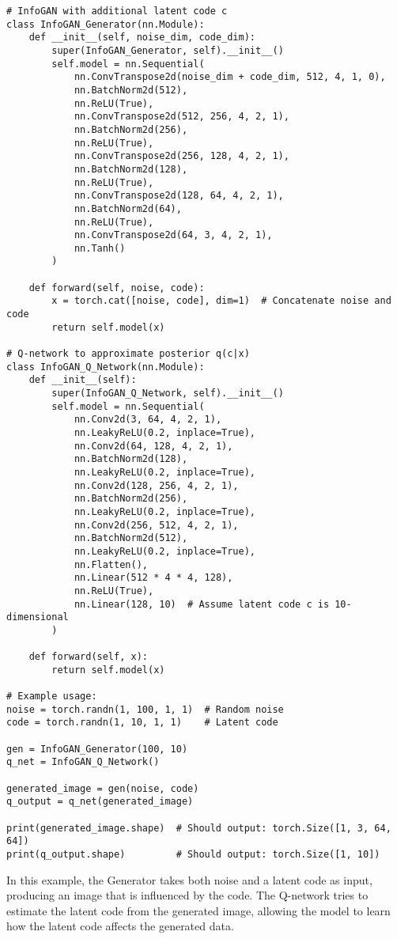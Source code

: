 \begin{lstlisting}[style=python]
# InfoGAN with additional latent code c
class InfoGAN_Generator(nn.Module):
    def __init__(self, noise_dim, code_dim):
        super(InfoGAN_Generator, self).__init__()
        self.model = nn.Sequential(
            nn.ConvTranspose2d(noise_dim + code_dim, 512, 4, 1, 0),
            nn.BatchNorm2d(512),
            nn.ReLU(True),
            nn.ConvTranspose2d(512, 256, 4, 2, 1),
            nn.BatchNorm2d(256),
            nn.ReLU(True),
            nn.ConvTranspose2d(256, 128, 4, 2, 1),
            nn.BatchNorm2d(128),
            nn.ReLU(True),
            nn.ConvTranspose2d(128, 64, 4, 2, 1),
            nn.BatchNorm2d(64),
            nn.ReLU(True),
            nn.ConvTranspose2d(64, 3, 4, 2, 1),
            nn.Tanh()
        )

    def forward(self, noise, code):
        x = torch.cat([noise, code], dim=1)  # Concatenate noise and code
        return self.model(x)

# Q-network to approximate posterior q(c|x)
class InfoGAN_Q_Network(nn.Module):
    def __init__(self):
        super(InfoGAN_Q_Network, self).__init__()
        self.model = nn.Sequential(
            nn.Conv2d(3, 64, 4, 2, 1),
            nn.LeakyReLU(0.2, inplace=True),
            nn.Conv2d(64, 128, 4, 2, 1),
            nn.BatchNorm2d(128),
            nn.LeakyReLU(0.2, inplace=True),
            nn.Conv2d(128, 256, 4, 2, 1),
            nn.BatchNorm2d(256),
            nn.LeakyReLU(0.2, inplace=True),
            nn.Conv2d(256, 512, 4, 2, 1),
            nn.BatchNorm2d(512),
            nn.LeakyReLU(0.2, inplace=True),
            nn.Flatten(),
            nn.Linear(512 * 4 * 4, 128),
            nn.ReLU(True),
            nn.Linear(128, 10)  # Assume latent code c is 10-dimensional
        )

    def forward(self, x):
        return self.model(x)

# Example usage:
noise = torch.randn(1, 100, 1, 1)  # Random noise
code = torch.randn(1, 10, 1, 1)    # Latent code

gen = InfoGAN_Generator(100, 10)
q_net = InfoGAN_Q_Network()

generated_image = gen(noise, code)
q_output = q_net(generated_image)

print(generated_image.shape)  # Should output: torch.Size([1, 3, 64, 64])
print(q_output.shape)         # Should output: torch.Size([1, 10])
\end{lstlisting}

In this example, the Generator takes both noise and a latent code as input, producing an image that is influenced by the code. The Q-network tries to estimate the latent code from the generated image, allowing the model to learn how the latent code affects the generated data.

